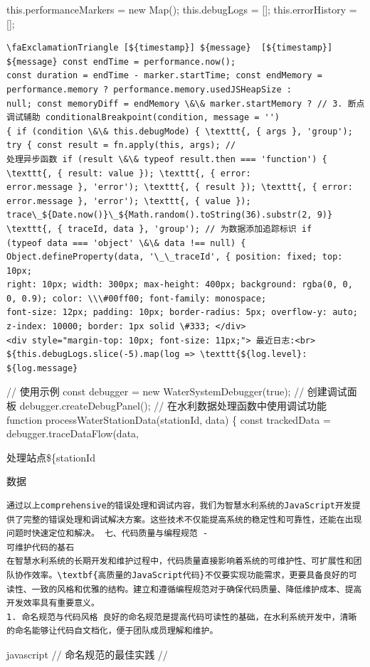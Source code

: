 {{{{{{{{{{{this.performanceMarkers = new Map(); this.debugLogs = {[}{]}; this.errorHistory = {[}{]}; } \begin{verbatim}
\faExclamationTriangle [${timestamp}] ${message}  [${timestamp}] ${message} const endTime = performance.now();
const duration = endTime - marker.startTime; const endMemory = performance.memory ? performance.memory.usedJSHeapSize :
null; const memoryDiff = endMemory \&\& marker.startMemory ? // 3. 断点调试辅助 conditionalBreakpoint(condition, message = '')
{ if (condition \&\& this.debugMode) { \texttt{, { args }, 'group'); try { const result = fn.apply(this, args); //
处理异步函数 if (result \&\& typeof result.then === 'function') { \texttt{, { result: value }); \texttt{, { error:
error.message }, 'error'); \texttt{, { result }); \texttt{, { error: error.message }, 'error'); \texttt{, { value });
trace\_${Date.now()}\_${Math.random().toString(36).substr(2, 9)} \texttt{, { traceId, data }, 'group'); // 为数据添加追踪标识 if
(typeof data === 'object' \&\& data !== null) { Object.defineProperty(data, '\_\_traceId', { position: fixed; top: 10px;
right: 10px; width: 300px; max-height: 400px; background: rgba(0, 0, 0, 0.9); color: \\\#00ff00; font-family: monospace;
font-size: 12px; padding: 10px; border-radius: 5px; overflow-y: auto; z-index: 10000; border: 1px solid \#333; </div>
<div style="margin-top: 10px; font-size: 11px;"> 最近日志:<br> ${this.debugLogs.slice(-5).map(log => \texttt{${log.level}:
${log.message} \end{verbatim} // 使用示例 const debugger = new WaterSystemDebugger(true); // 创建调试面板
debugger.createDebugPanel(); // 在水利数据处理函数中使用调试功能 function processWaterStationData(stationId, data) \{ const trackedData
= debugger.traceDataFlow(data, }处理站点\$\{stationId}数据 \begin{lstlisting}
通过以上comprehensive的错误处理和调试内容，我们为智慧水利系统的JavaScript开发提供了完整的错误处理和调试解决方案。这些技术不仅能提高系统的稳定性和可靠性，还能在出现问题时快速定位和解决。 七、代码质量与编程规范 -
可维护代码的基石
在智慧水利系统的长期开发和维护过程中，代码质量直接影响着系统的可维护性、可扩展性和团队协作效率。\textbf{高质量的JavaScript代码}不仅要实现功能需求，更要具备良好的可读性、一致的风格和优雅的结构。建立和遵循编程规范对于确保代码质量、降低维护成本、提高开发效率具有重要意义。
1. 命名规范与代码风格 良好的命名规范是提高代码可读性的基础，在水利系统开发中，清晰的命名能够让代码自文档化，便于团队成员理解和维护。 \end{lstlisting} javascript // 命名规范的最佳实践 //
}}}}}}}}
